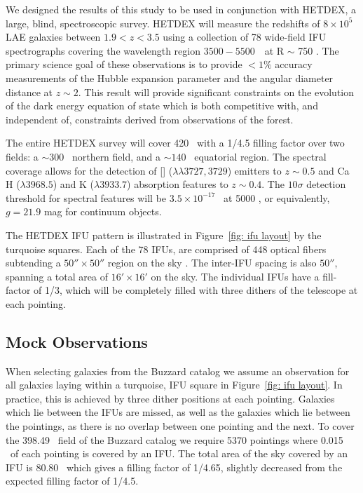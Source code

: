 We designed the results of this study to be used in conjunction with HETDEX, a large, blind, spectroscopic survey. HETDEX will measure the redshifts of $8 \times 10^5$ LAE galaxies between $1.9 < z < 3.5$ using a collection of 78 wide-field IFU spectrographs covering the wavelength region $3500 - 5500$~\AAA\ at R $\sim$ 750 \citep{Hill2008}. The primary science goal of these observations is to provide $<1\%$ accuracy measurements of the Hubble expansion parameter and the angular diameter distance at $z\sim2$. This result will provide significant constraints on the evolution of the dark energy equation of state which is both competitive with, and independent of, constraints derived from observations of the \lya forest.

The entire HETDEX survey will cover 420 \degsq\ with a 1/4.5 filling factor over two fields: a $\sim 300$ \degsq\ northern field, and a $\sim 140$ \degsq\ equatorial region. The spectral coverage allows for the detection of \hbox{[]} ($\lambda\lambda 3727,3729$) emitters to $z\sim 0.5$ and Ca H ($\lambda 3968.5$) and K ($\lambda 3933.7$) absorption features to $z\sim 0.4$. The $10 \sigma$ detection threshold for spectral features will be $3.5\times10^{-17}$ \ergscm\ at 5000 \AAA, or equivalently, $g = 21.9$ mag for continuum objects. 

The HETDEX IFU pattern is illustrated in Figure~\ref{fig: ifu layout} by the turquoise squares. Each of the 78 IFUs, are comprised of 448 optical fibers subtending a $50'' \times 50''$ region on the sky \citep{Kelz2014}. The inter-IFU spacing is also $50''$, spanning a total area of $16'\times 16'$ on the sky. The individual IFUs have a fill-factor of 1/3, which will be completely filled with three dithers of the telescope at each pointing.

\subsection{Mock Observations}\label{sec: observations}
When selecting galaxies from the Buzzard catalog we assume an observation for all galaxies laying within a turquoise, IFU square in Figure~\ref{fig: ifu layout}. In practice, this is achieved by three dither positions at each pointing. Galaxies which lie between the IFUs are missed, as well as the galaxies which lie between the pointings, as there is no overlap between one pointing and the next. To cover the 398.49 \degsq\ field of the Buzzard catalog we require 5370 pointings where 0.015 \degsq\ of each pointing is covered by an IFU. The total area of the sky covered by an IFU is 80.80 \degsq\ which gives a filling factor of 1/4.65, slightly decreased from the expected filling factor of 1/4.5.

